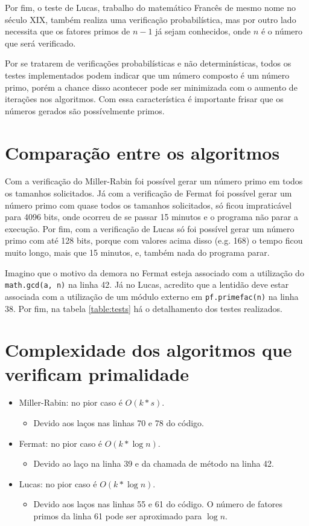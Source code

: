 \documentclass[12pt]{article}
\begin{document}
Por fim, o teste de Lucas, trabalho do matemático Francês de mesmo nome no
século XIX, também realiza uma verificação probabilística, mas por outro lado
necessita que os fatores primos de $n - 1$ já sejam conhecidos, onde $n$ é o
número que será verificado.

Por se tratarem de verificações probabilísticas e não determinísticas, todos os
testes implementados podem indicar que um número composto é um número primo,
porém a chance disso acontecer pode ser minimizada com o aumento de iterações
nos algoritmos. Com essa característica é importante frisar que os números
gerados são possívelmente primos.

\section{Comparação entre os algoritmos}
Com a verificação do Miller-Rabin foi possível gerar um número primo em todos os
tamanhos solicitados. Já com a verificação de Fermat foi possível gerar um
número primo com quase todos os tamanhos solicitados, só ficou impraticável para
4096 bits, onde ocorreu de se passar 15 minutos e o programa não parar a
execução. Por fim, com a verificação de Lucas só foi possível gerar um número
primo com até 128 bits, porque com valores acima disso (e.g. 168) o tempo ficou
muito longo, mais que 15 minutos, e, também nada do programa parar.

Imagino que o motivo da demora no Fermat esteja associado com a utilização do
\lstinline{math.gcd(a, n)} na linha 42. Já no Lucas, acredito que a lentidão
deve estar associada com a utilização de um módulo externo em
\lstinline{pf.primefac(n)} na linha 38. Por fim, na tabela \ref{table:tests} há
o detalhamento dos testes realizados.

\section{Complexidade dos algoritmos que verificam primalidade}
\begin{itemize}
  \item Miller-Rabin: no pior caso é $O(k * s)$.
  \begin{itemize}
    \item Devido aos laços nas linhas 70 e 78 do código.
  \end{itemize}
  \item Fermat: no pior caso é $O(k * \log n)$.
  \begin{itemize}
    \item Devido ao laço na linha 39 e da chamada de método na linha 42.
  \end{itemize}
  \item Lucas: no pior caso é $O(k * \log n)$.
  \begin{itemize}
    \item Devido aos laços nas linhas 55 e 61 do código. O número de fatores
    primos da linha 61 pode ser aproximado para $\log n$.
  \end{itemize}
\end{itemize}
\end{document}
